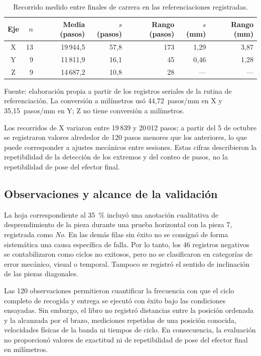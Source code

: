 \begin{table}[H]
    \centering
    \caption{Recorrido medido entre finales de carrera en las referenciaciones registradas.}
    \label{tab:fase6_repetibilidad}
    \begin{tabular}{c r r r r r r}
        \hline
        Eje & $n$ & Media (pasos) & $s$ (pasos) & Rango (pasos) & $s$ (mm) & Rango (mm) \\
        \hline
        X & 13 & 19\,944,5 & 57,8 & 173 & 1,29 & 3,87 \\
        Y & 9 & 11\,811,9 & 16,1 & 45 & 0,46 & 1,28 \\
        Z & 9 & 14\,687,2 & 10,8 & 28 & --- & --- \\
        \hline
    \end{tabular}
    \par\small\raggedright Fuente: elaboración propia a partir de los registros seriales de la rutina de referenciación. La conversión a milímetros usó 44,72~pasos/mm en X y 35,15~pasos/mm en Y; Z no tiene conversión a milímetros.
\end{table}

Los recorridos de X variaron entre 19\,839 y 20\,012 pasos; a partir del 5 de octubre se registraron valores alrededor de 120 pasos menores que los anteriores, lo que puede corresponder a ajustes mecánicos entre sesiones. Estas cifras describieron la repetibilidad de la detección de los extremos y del conteo de pasos, no la repetibilidad de pose del efector final.

\subsection{Observaciones y alcance de la validación}

La hoja correspondiente al 35~\% incluyó una anotación cualitativa de desprendimiento de la pieza durante una prueba horizontal con la pieza 7, registrada como \textit{No}. En las demás filas sin éxito no se consignó de forma sistemática una causa específica de falla. Por lo tanto, los 46 registros negativos se contabilizaron como ciclos no exitosos, pero no se clasificaron en categorías de error mecánico, visual o temporal. Tampoco se registró el sentido de inclinación de las piezas diagonales.

Las 120 observaciones permitieron cuantificar la frecuencia con que el ciclo completo de recogida y entrega se ejecutó con éxito bajo las condiciones ensayadas. Sin embargo, el libro no registró distancias entre la posición ordenada y la alcanzada por el brazo, mediciones repetidas de una posición conocida, velocidades físicas de la banda ni tiempos de ciclo. En consecuencia, la evaluación no proporcionó valores de exactitud ni de repetibilidad de pose del efector final en milímetros.
